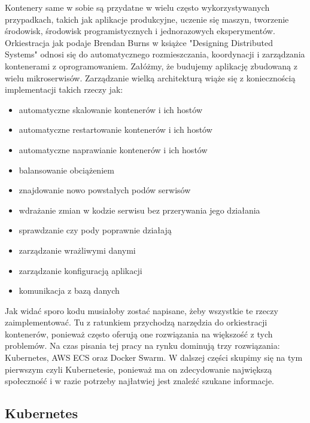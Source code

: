 Kontenery same w sobie są przydatne w wielu często wykorzystywanych przypadkach, takich jak aplikacje produkcyjne, uczenie się maszyn, tworzenie środowisk, środowisk programistycznych i jednorazowych eksperymentów. Orkiestracja jak podaje Brendan Burns w książce "Designing Distributed Systems" odnosi się do automatycznego rozmieszczania, koordynacji i zarządzania kontenerami z oprogramowaniem. Załóżmy, że budujemy aplikację zbudowaną z wielu mikroserwisów. Zarządzanie wielką architekturą wiąże się z koniecznością implementacji takich rzeczy jak:
\begin{itemize}
    \item automatyczne skalowanie kontenerów i ich hostów
    \item automatyczne restartowanie kontenerów i ich hostów
    \item automatyczne naprawianie kontenerów i ich hostów
    \item balansowanie obciążeniem 
    \item znajdowanie nowo powstałych podów serwisów 
    \item wdrażanie zmian w kodzie serwisu bez przerywania jego działania 
    \item sprawdzanie czy pody poprawnie działają
    \item zarządzanie wrażliwymi danymi
    \item zarządzanie konfiguracją aplikacji
    \item komunikacja z bazą danych
\end{itemize}
Jak widać sporo kodu musiałoby zostać napisane, żeby wszystkie te rzeczy zaimplementować. Tu z ratunkiem przychodzą narzędzia do orkiestracji kontenerów, ponieważ często oferują one rozwiązania na większość z tych problemów. Na czas pisania tej pracy na rynku dominują trzy rozwiązania: Kubernetes, AWS ECS oraz Docker Swarm. W dalszej części skupimy się na tym pierwszym czyli Kubernetesie, ponieważ ma on zdecydowanie największą społeczność i w razie potrzeby najłatwiej jest znaleźć szukane informacje.

\subsection{Kubernetes}

